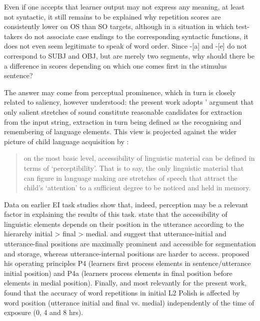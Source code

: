 Even if one accepts that learner output may not express any meaning, at least not syntactic, it still remains to be explained why repetition scores are consistently lower on OS than SO targets, although in a situation in which test-takers do not associate case endings to the corresponding syntactic functions, it does not even seem legitimate to speak of word order. Since -[a] and -[e] do not correspond to SUBJ and OBJ, but are merely two segments, why should there be a difference in scores depending on which one comes first in the stimulus sentence?

The answer may come from perceptual prominence, which in turn is closely related to saliency, however understood: the present work adopts \citeauthor[1030]{Peters1985}' \citeyear[1030]{Peters1985} argument that only salient stretches of sound constitute reasonable candidates for extraction from the input string, extraction in turn being defined as the recognising and remembering of language elements. This view is projected against the wider picture of child language acquisition by \citet[1164]{Slobin1985}: 

\begin{quote}
on the most basic level, accessibility of linguistic material can be defined in terms of ‘perceptibility’. That is to say, the only linguistic material that can figure in language making are stretches of speech that attract the child’s ‘attention’ to a sufficient degree to be noticed and held in memory.
\end{quote}

Data on earlier EI task studies show that, indeed, perception may be a relevant factor in explaining the results of this task. \citet{GallimoreTharp1981} state that the accessibility of linguistic elements depends on their position in the utterance according to the hierarchy initial > final > medial. \citet{Peters1985} and \citet[1166]{Slobin1985} suggest that utterance-initial and utterance-final positions are maximally prominent and accessible for segmentation and storage, whereas utterance-internal positions are harder to access. \citet[300]{VanPatten2000} proposed his operating principles P4 (learners first process elements in sentence/utterance initial position) and P4a (learners process elements in final position before elements in medial position). Finally, and most relevantly for the present work, \citet[151]{Rast2008} found that the accuracy of word repetitions in initial L2 Polish is affected by word position (utterance initial and final vs. medial) independently of the time of exposure (0, 4 and 8 hrs). 

